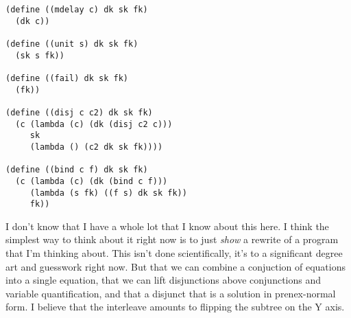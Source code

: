 \documentclass[11pt,twoside]{article}
\numberwithin{equation}{subsection} %
\begin{document}
\vspace{.5cm}

\begin{verbatim}
(define ((mdelay c) dk sk fk)
  (dk c))

(define ((unit s) dk sk fk)
  (sk s fk))

(define ((fail) dk sk fk)
  (fk))

(define ((disj c c2) dk sk fk)
  (c (lambda (c) (dk (disj c2 c)))
     sk
     (lambda () (c2 dk sk fk))))

(define ((bind c f) dk sk fk)
  (c (lambda (c) (dk (bind c f)))
     (lambda (s fk) ((f s) dk sk fk))
     fk))
\end{verbatim}







I don't know that I have a whole lot that I know about this here. I
think the simplest way to think about it right now is to just
\emph{show} a rewrite of a program that I'm thinking about. This isn't
done scientifically, it's to a significant degree art and guesswork
right now. But that we can combine a conjuction of equations into a
single equation, that we can lift disjunctions above conjunctions and
variable quantification, and that a disjunct that is a solution in
prenex-normal form. I believe that the interleave amounts to flipping
the subtree on the Y axis. 
\end{document}
